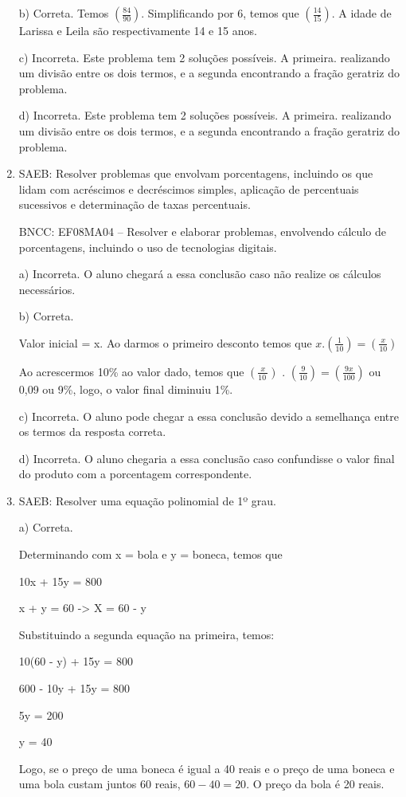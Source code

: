 \begin{enumerate}
b) Correta. Temos $(\frac{84}{90})$. Simplificando por 6, temos que
$(\frac{14}{15})$. A idade de Larissa e Leila são respectivamente 14 e
15 anos.

c) Incorreta. Este problema tem 2 soluções possíveis. A primeira.
realizando um divisão entre os dois termos, e a segunda encontrando a
fração geratriz do problema.

d) Incorreta. Este problema tem 2 soluções possíveis. A primeira.
realizando um divisão entre os dois termos, e a segunda encontrando a
fração geratriz do problema.

\item SAEB: Resolver problemas que envolvam porcentagens, incluindo os que
lidam com acréscimos e decréscimos simples, aplicação de percentuais
sucessivos e determinação de taxas percentuais.

BNCC: EF08MA04 -- Resolver e elaborar problemas, envolvendo cálculo de
porcentagens, incluindo o uso de tecnologias digitais.

a) Incorreta. O aluno chegará a essa conclusão caso não realize os
cálculos necessários.

b) Correta.

Valor inicial = x. Ao darmos o primeiro desconto temos que $x .
(\frac{1}{10}) = (\frac{x}{10})$

Ao acrescermos 10\% ao valor dado, temos que $(\frac{x}{10\ })$ .
$(\frac{9}{10}) = (\frac{9x}{100})$ ou 0,09 ou 9\%, logo, o valor
final diminuiu 1\%.

c) Incorreta. O aluno pode chegar a essa conclusão devido a
semelhança entre os termos da resposta correta.

d) Incorreta. O aluno chegaria a essa conclusão caso confundisse o
valor final do produto com a porcentagem correspondente.
\item SAEB: Resolver uma equação polinomial de 1º grau.

a) Correta. 

Determinando com x = bola e y = boneca, temos que

10x + 15y = 800

x + y = 60 -> X = 60 - y

Substituindo a segunda equação na primeira, temos:

10(60 - y) + 15y = 800

600 - 10y + 15y = 800

5y = 200

y = 40

Logo, se o preço de uma boneca é igual a 40 reais e o preço de uma
boneca e uma bola custam juntos 60 reais, $60 - 40 = 20$. O preço da bola
é 20 reais.


\end{enumerate}
